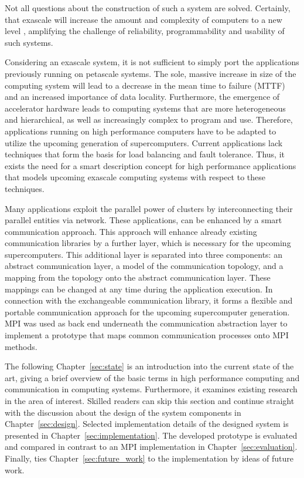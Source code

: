 Not all questions about the construction of such a system are
solved. Certainly, that exascale will increase the amount and
complexity of computers to a new level \cite{ref:cresta}, amplifying
the challenge of reliability, programmability and usability of such
systems.

Considering an exascale system, it is not sufficient to simply port
the applications previously running on petascale systems. The sole,
massive increase in size of the computing system will lead to a
decrease in the mean time to failure (MTTF) and an increased
importance of data locality.  Furthermore, the emergence of
accelerator hardware leads to computing systems that are more
heterogeneous and hierarchical, as well as increasingly complex to
program and use. Therefore, applications running on high performance
computers have to be adapted to utilize the upcoming generation of
supercomputers.  Current applications lack techniques that form the
basis for load balancing and fault tolerance.  Thus, it exists the
need for a smart description concept for high performance applications
that models upcoming exascale computing systems with respect to these
techniques.

Many applications exploit the parallel power of clusters by
interconnecting their parallel entities via network. These
applications, can be enhanced by a smart communication approach. This
approach will enhance already existing communication libraries by a
further layer, which is necessary for the upcoming
supercomputers. This additional layer is separated into three
components: an abstract communication layer, a model of the
communication topology, and a mapping from the topology onto the
abstract communication layer.  These mappings can be changed at any
time during the application execution. In connection with the
exchangeable communication library, it forms a flexible and portable
communication approach for the upcoming supercomputer generation. MPI
was used as back end underneath the communication abstraction layer to
implement a prototype that maps common communication processes
onto MPI methods.

The following Chapter~\ref{sec:state} is an introduction into the
current state of the art, giving a brief overview of the basic terms
in high performance computing and communication in computing
systems. Furthermore, it examines existing research in the area of
interest. Skilled readers can skip this section and continue straight
with the discussion about the design of the system components in
Chapter~\ref{sec:design}.  Selected implementation details of the
designed system is presented in Chapter~\ref{sec:implementation}. The
developed prototype is evaluated and compared in contrast to an MPI
implementation in Chapter~\ref{sec:evaluation}. Finally, ties
Chapter~\ref{sec:future_work} to the implementation by ideas of future
work.


\cleardoublepage

